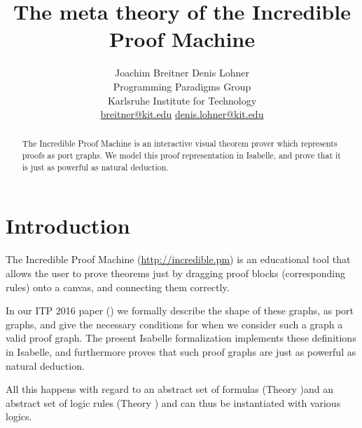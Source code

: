 \documentclass[11pt,a4paper,parskip=half]{scrartcl}
\begin{document}
\title{The meta theory of the Incredible Proof Machine}
\author{
Joachim Breitner \hspace{2cm} Denis Lohner\\
Programming Paradigms Group\\
Karlsruhe Institute for Technology\\
\url{breitner@kit.edu} \hspace{2cm} \url{denis.lohner@kit.edu}
}
\maketitle

\begin{abstract}
\noindent
The Incredible Proof Machine is an interactive visual theorem prover which represents proofs as
port graphs. We model this proof representation in Isabelle, and prove that it is just
as powerful as natural deduction.
\end{abstract}

\tableofcontents

\section{Introduction}

The Incredible Proof Machine (\url{http://incredible.pm}) is an educational tool that allows the user to
prove theorems just by dragging proof blocks (corresponding rules) onto a canvas, and connecting them
correctly.

In our ITP 2016 paper (\cite{incredible}) we formally describe the shape of these graphs, as port graphs,
and give the necessary conditions for when we consider such a graph a valid proof graph. The present
Isabelle formalization implements these definitions in Isabelle, and furthermore proves that such
proof graphs are just as powerful as natural deduction.

All this happens with regard to an abstract set of formulas (Theory )and an abstract set of logic rules
(Theory ) and can thus be instantiated with various logics.
\end{document}
